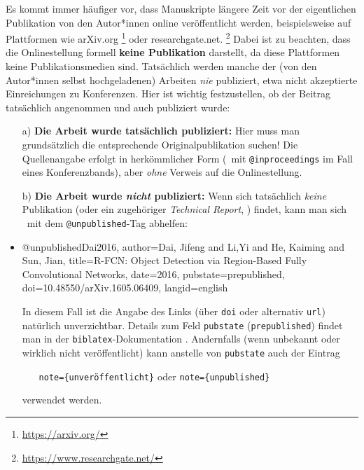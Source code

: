 Es kommt immer häufiger vor, dass Manuskripte längere Zeit vor der
eigentlichen Pub\-likation von den Autor*innen online veröffentlicht werden,
beispielsweise auf Plattformen wie \textsf{arXiv.org}%
\footnote{\url{https://arxiv.org/}}
oder \textsf{researchgate.net}.%
\footnote{\url{https://www.researchgate.net/}}
Dabei ist zu beachten, dass die Onlinestellung formell \textbf{keine
Publikation} darstellt, da diese Plattformen keine Publikationsmedien sind.
Tatsächlich werden manche der (von den Autor*innen selbst hochgeladenen)
Arbeiten \emph{nie} publiziert, etwa nicht akzeptierte Einreichungen zu
Konferenzen. Hier ist wichtig festzustellen, ob der Beitrag tatsächlich
angenommen und auch publiziert wurde:
%
\begin{itemize}
\item[a)]
\textbf{Die Arbeit wurde tatsächlich publiziert:} Hier muss man grundsätzlich
die entsprechende Original\-publikation suchen! Die Quellenangabe erfolgt in
herkömmlicher Form (\zB\ mit \texttt{@inproceedings} im Fall eines
Konferenzbands), aber \emph{ohne} Verweis auf die Onlinestellung.
\item[b)]
\textbf{Die Arbeit wurde \emph{nicht} publiziert:} Wenn sich tatsächlich
\emph{keine} Publikation (oder ein zugehöriger \emph{Technical Report}, \so)
findet, kann man sich \evtl\ mit dem \texttt{@unpublished}-Tag abhelfen:
\item %
\begin{GenericCode}[numbers=none]
@unpublished{Dai2016,
  author={Dai, Jifeng and Li,Yi and He, Kaiming and Sun, Jian},
  title={{R-FCN:} Object Detection via Region-Based Fully Convolutional Networks},
  date={2016},
  pubstate={prepublished},
  doi={10.48550/arXiv.1605.06409},
  langid={english}
}
\end{GenericCode}
\begin{itemize}
\item[\cite{Dai2016}] 
\end{itemize}
%
\item[] %
In diesem Fall ist die Angabe des Links (über \texttt{doi} oder alternativ
\texttt{url}) natürlich unverzichtbar. Details zum Feld \texttt{pubstate}
(\texttt{prepublished}) findet man in der \texttt{biblatex}-Dokumentation
\cite[Abschn.\ 4.9.2.11]{Kime2022}. Andernfalls (wenn unbekannt oder wirklich
nicht veröffentlicht) kann anstelle von \texttt{pubstate} auch der Eintrag
%
\begin{itemize}
\item[]\texttt{note=\{unveröffentlicht\}} \quad oder
   \quad \texttt{note=\{unpublished\}}
\end{itemize}
%
verwendet werden.
\end{itemize}



